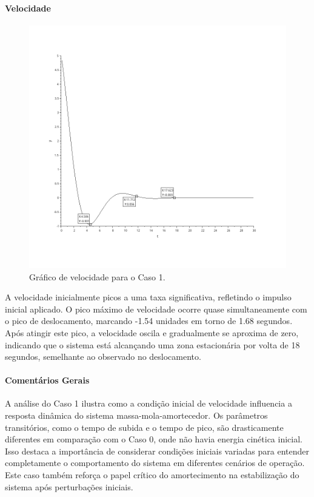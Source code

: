 \paragraph{Velocidade}
\begin{figure}[H]
    \centering
    \includegraphics[height=0.7\textwidth]{final/2-atividade/assets/velocidade-caso-1.png}
    \caption{Gráfico de velocidade para o Caso 1.}
\end{figure}
A velocidade inicialmente picos a uma taxa significativa, refletindo o impulso inicial aplicado. O pico máximo de velocidade ocorre quase simultaneamente com o pico de deslocamento, marcando -1.54 unidades em torno de 1.68 segundos. Após atingir este pico, a velocidade oscila e gradualmente se aproxima de zero, indicando que o sistema está alcançando uma zona estacionária por volta de 18 segundos, semelhante ao observado no deslocamento.


\paragraph{Comentários Gerais}
A análise do Caso 1 ilustra como a condição inicial de velocidade influencia a resposta dinâmica do sistema massa-mola-amortecedor. Os parâmetros transitórios, como o tempo de subida e o tempo de pico, são drasticamente diferentes em comparação com o Caso 0, onde não havia energia cinética inicial. Isso destaca a importância de considerar condições iniciais variadas para entender completamente o comportamento do sistema em diferentes cenários de operação. Este caso também reforça o papel crítico do amortecimento na estabilização do sistema após perturbações iniciais.


